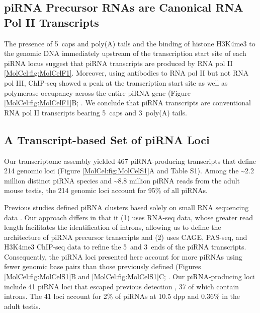   \subsection{piRNA Precursor RNAs are Canonical RNA Pol II Transcripts}
    \label{MolCel:subsec:Precursors are Pol II Txs}

    The presence of 5\textprime~caps and poly(A) tails and the binding of histone H3K4me3 to the genomic DNA immediately upstream of the transcription start site of each piRNA locus suggest that piRNA transcripts are produced by RNA pol II \ref{MolCel:fig:MolCelF1}. Moreover, using antibodies to RNA pol II but not RNA pol III, ChIP-seq showed a peak at the transcription start site as well as polymerase occupancy across the entire piRNA gene (Figure \ref{MolCel:fig:MolCelF1}B; \citep{Kutter2011}. We conclude that piRNA transcripts are conventional RNA pol II transcripts bearing 5\textprime~caps and 3\textprime~poly(A) tails.

  \subsection{A Transcript-based Set of piRNA Loci}
    \label{MolCel:subsec:A TX-based set of piRNA loci}

    Our transcriptome assembly yielded 467 piRNA-producing transcripts that define 214 genomic loci (Figure \ref{MolCel:fig:MolCelS1}A and Table S1). Among the \textasciitilde2.2 million distinct piRNA species and \textasciitilde8.8 million piRNA reads from the adult mouse testis, the 214 genomic loci account for 95\% of all piRNAs.

    Previous studies defined piRNA clusters based solely on small RNA sequencing data \citep{Girard2006, Lau2006, Aravin2007a}. Our approach differs in that it (1) uses RNA-seq data, whose greater read length facilitates the identification of introns, allowing us to define the architecture of piRNA precursor transcripts and (2) uses CAGE, PAS-seq, and H3K4me3 ChIP-seq data to refine the 5\textprime~and 3\textprime~ends of the piRNA transcripts. Consequently, the piRNA loci presented here account for more piRNAs using fewer genomic base pairs than those previously defined (Figures \ref{MolCel:fig:MolCelS1}B and \ref{MolCel:fig:MolCelS1}C; \citep{Lau2006, Girard2006}. Our piRNA-producing loci include 41 piRNA loci that escaped previous detection \citep{Girard2006, Lau2006, Aravin2007a}, 37 of which contain introns. The 41 loci account for 2\% of piRNAs at 10.5 dpp and 0.36\% in the adult testis.

